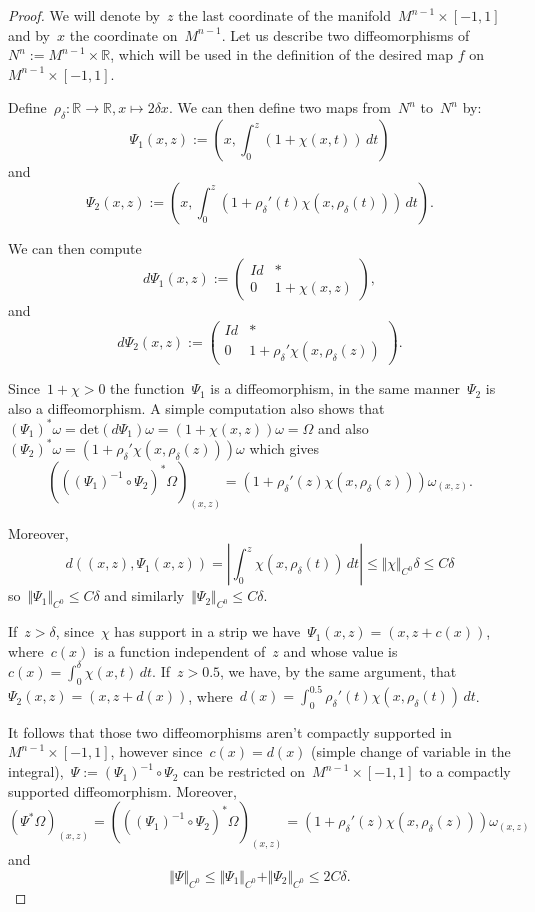 \documentclass[10pt]{amsart}
\begin{document}
\begin{proof}
We will denote by~$z$ the last coordinate of the manifold~$M^{n-1}\times [-1,1]$ and by~$x$ the coordinate on~$M^{n-1}$. Let us describe two diffeomorphisms of~$N^n:=M^{n-1}\times \mathbb{R}$, which will be used in the definition of the desired map $f$ on~$M^{n-1}\times [-1,1]$.

Define~$\rho_\delta: \mathbb{R}\rightarrow \mathbb{R}, x\mapsto 2\delta x$. We can then define two maps from~$N^n$ to~$N^n$ by:
$$\Psi_1(x,z):=\left(x,\int_0^z(1+\chi(x,t))\,dt\right)$$
and 
$$\Psi_2(x,z):=\left(x,\int_0^z(1+\rho_\delta'(t)\chi(x,\rho_\delta(t)))\,dt\right).$$

We can then compute 
$$d\Psi_1(x,z):=\begin{pmatrix}
	Id & *\\
	0 &  1+\chi(x,z)
\end{pmatrix},$$
and
$$d\Psi_2(x,z):=\begin{pmatrix}
	Id & *\\
	0 &  1+\rho_\delta'\chi(x,\rho_\delta(z))
\end{pmatrix}.$$

Since~$1+\chi>0$ the function~$\Psi_1$ is a diffeomorphism, in the same manner~$\Psi_2$ is also a diffeomorphism. A simple computation also shows that~$(\Psi_{1})^*\omega=\text{det}(d \Psi_1)\omega=(1+\chi(x,z))\omega=\Omega$ and also~$(\Psi_{2})^*\omega=(1+\rho_\delta'\chi(x,\rho_\delta(z)))\omega$ which gives 
$$\left(((\Psi_1)^{-1} \circ \Psi_2)^*\Omega\right)_{(x,z)}=(1+\rho_\delta'(z)\chi(x,\rho_\delta(z)))\omega_{(x,z)}.$$

Moreover, 
$$d\left((x,z),\Psi_1(x,z)\right)=\left\vert\int_0^z \chi(x,\rho_\delta(t))\,dt\right\vert \leq \Vert \chi \Vert_{C^0} \delta\leq C \delta$$
so~$\Vert \Psi_1 \Vert_{C^0}\leq C\delta$ and similarly~$\Vert \Psi_2 \Vert_{C^0}\leq C \delta$.

If~$z>\delta$, since~$\chi$ has support in a strip we have~$\Psi_1(x,z)=(x,z+c(x))$, where~$c(x)$ is a function independent of~$z$ and whose value is~$c(x)=\int_0^\delta \chi(x,t)\, dt$. If~$z>0.5$, we have, by the same argument, that~$\Psi_2(x,z)=(x,z+d(x))$, where~$d(x)=\int_0^{0.5}\rho_\delta'(t)\chi(x,\rho_\delta(t))\, dt$. 

It follows that those two diffeomorphisms aren't compactly supported in~$M^{n-1}\times [-1,1]$, however since~$c(x)=d(x)$ (simple change of variable in the integral),~$\Psi:=(\Psi_1)^{-1} \circ \Psi_2$ can be restricted on~$M^{n-1}\times [-1,1]$ to a compactly supported diffeomorphism. Moreover,~$$\left(\Psi^*\Omega\right)_{(x,z)}=\left(((\Psi_1)^{-1} \circ \Psi_2)^*\Omega\right)_{(x,z)}=(1+\rho_\delta'(z)\chi(x,\rho_\delta(z)))\omega_{(x,z)}$$ and 
$$\Vert\Psi\Vert_{C^0}\leq \Vert \Psi_1\Vert_{C^0}+\Vert \Psi_2\Vert_{C^0}\leq 2C\delta.$$


\end{proof}
\end{document}
